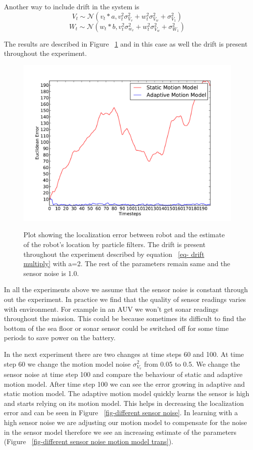 \documentclass[12pt]{dalcsthesis}
\begin{document}
Another way to include drift in the system is 
\begin{equation}
\label{eq- drift multiply}
V_{t}\sim\mathcal{{N}}(v_{t}*a,v_{t}^{2}\sigma_{V_{v}}^{2}+w_{t}^{2}\sigma_{V_{w}}^{2}+\sigma_{V_{1}}^{2})
\end{equation}
\begin{equation}
W_{t}\sim\mathcal{{N}}(w_{t}*b,v_{t}^{2}\sigma_{w_{v}}^{2}+w_{t}^{2}\sigma_{V_{w}}^{2}+\sigma_{W_{1}}^{2})
\end{equation}


The results are described in Figure ~\ref{fig-drift_multiply} and in this case as well the drift is present throughout the experiment.
\begin{figure}
  \centering
     {\includegraphics[height = 3.0 in]{./plots/200_005_005_s_10_traj_3_drift_20_multiply.pdf}}
  \caption{\label{fig-drift_multiply} Plot showing the localization error between robot and the estimate of the robot's location by particle filters. The drift is present throughout the experiment described by equation ~\ref{eq- drift multiply} with a=2. The rest of the parameters remain same and the sensor noise is 1.0. }
\end{figure}

In all the experiments above we assume that the sensor noise is constant through out the experiment. In practice we find that the quality of sensor readings varies with environment. For example in an AUV we won't get sonar readings throughout the mission. This could be because sometimes its difficult to find the bottom of the sea floor or sonar sensor could be switched off for some time periods to save power on the battery.

In the next experiment there are two changes at time steps 60 and 100. At time step 60 we change the motion model noise $\sigma_{V_{v}}^2$ from 0.05 to 0.5. We change the sensor noise  at time step 100 and compare the behaviour of static and adaptive motion model. After time step 100 we can see the error growing in adaptive and static motion model. The adaptive motion model quickly learns the sensor is high and starts relying on its motion model. This helps in decreasing the localization error and can be seen in Figure ~\ref{fig-different sensor noise}. In learning with a high sensor noise we are adjusting our motion model to compensate for the noise in the sensor model therefore we see an increasing estimate of the parameters (Figure ~\ref{fig-different sensor noise motion model trans}).
\end{document}
